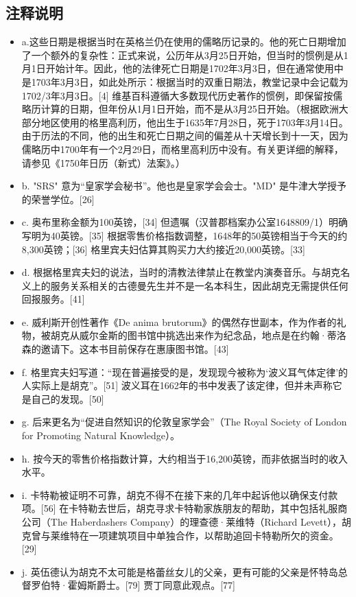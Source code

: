 \subsection{注释说明}
\begin{itemize}
\item a.这些日期是根据当时在英格兰仍在使用的儒略历记录的。他的死亡日期增加了一个额外的复杂性：正式来说，公历年从3月25日开始，但当时的惯例是从1月1日开始计年。因此，他的法律死亡日期是1702年3月3日，但在通常使用中是1703年3月3日，如此处所示：根据当时的双重日期法，教堂记录中会记载为1702/3年3月3日。[4] 维基百科遵循大多数现代历史著作的惯例，即保留按儒略历计算的日期，但年份从1月1日开始，而不是从3月25日开始。（根据欧洲大部分地区使用的格里高利历，他出生于1635年7月28日，死于1703年3月14日。由于历法的不同，他的出生和死亡日期之间的偏差从十天增长到十一天，因为儒略历中1700年有一个2月29日，而格里高利历中没有。有关更详细的解释，请参见《1750年日历（新式）法案》。）
\item b. "SRS" 意为“皇家学会秘书”。他也是皇家学会会士。"MD" 是牛津大学授予的荣誉学位。[26]
\item c. 奥布里称金额为100英镑，[34] 但遗嘱（汉普郡档案办公室1648809/1）明确写明为40英镑。[35] 根据零售价格指数调整，1648年的50英镑相当于今天的约8,300英镑；[36] 格里宾夫妇估算其购买力大约接近20,000英镑。[33]
\item d. 根据格里宾夫妇的说法，当时的清教法律禁止在教堂内演奏音乐。与胡克名义上的服务关系相关的古德曼先生并不是一名本科生，因此胡克无需提供任何回报服务。[41]
\item e. 威利斯开创性著作《De anima brutorum》的偶然存世副本，作为作者的礼物，被胡克从威尔金斯的图书馆中挑选出来作为纪念品，地点是在约翰·蒂洛森的邀请下。这本书目前保存在惠康图书馆。[43]
\item f. 格里宾夫妇写道：“现在普遍接受的是，发现现今被称为‘波义耳气体定律’的人实际上是胡克”。[51] 波义耳在1662年的书中发表了该定律，但并未声称它是自己的发现。[50]
\item g. 后来更名为“促进自然知识的伦敦皇家学会”（The Royal Society of London for Promoting Natural Knowledge）。
\item h. 按今天的零售价格指数计算，大约相当于16,200英镑，而非依据当时的收入水平。
\item i. 卡特勒被证明不可靠，胡克不得不在接下来的几年中起诉他以确保支付款项。[56] 在卡特勒去世后，胡克寻求卡特勒家族朋友的帮助，其中包括礼服商公司（The Haberdashers Company）的理查德·莱维特（Richard Levett），胡克曾与莱维特在一项建筑项目中单独合作，以帮助追回卡特勒所欠的资金。[29]
\item j. 英伍德认为胡克不太可能是格蕾丝女儿的父亲，更有可能的父亲是怀特岛总督罗伯特·霍姆斯爵士。[79] 贾丁同意此观点。[77]

\end{itemize}
